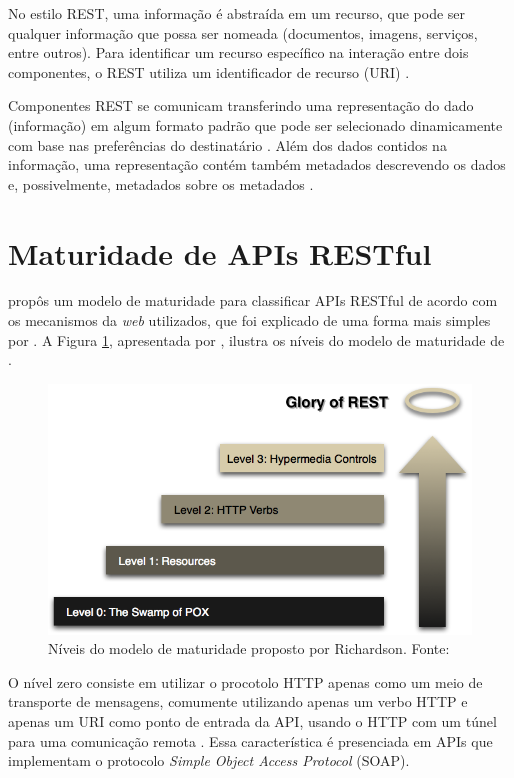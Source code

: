   No estilo REST, uma informação é abstraída em um recurso, que pode ser qualquer informação que possa ser nomeada
  (documentos, imagens, serviços, entre outros). Para identificar um recurso específico na interação entre dois
  componentes, o REST utiliza um identificador de recurso (URI) \cite{fielding2002}.
  
  Componentes REST se comunicam transferindo uma representação do dado (informação) em algum formato padrão que pode
  ser selecionado dinamicamente com base nas preferências do destinatário \cite{fielding2002}. Além dos dados contidos na 
  informação, uma representação contém também metadados descrevendo os dados e, possivelmente, metadados sobre os
  metadados \cite{fielding2002}.
  
  \section{Maturidade de APIs RESTful}
  
       propôs um modelo de maturidade para classificar
      APIs RESTful de acordo com os mecanismos da \textit{web} utilizados,
      que foi explicado de uma forma mais simples por .
      A Figura \ref{fig:glory_of_rest}, apresentada por ,
      ilustra os níveis do modelo de maturidade de .
	
      \begin{figure}[h!]
	\centering
	\includegraphics[scale=0.5]{figuras/glory_of_rest.png}
	\caption{Níveis do modelo de maturidade proposto por Richardson. Fonte: \cite{fowler10}}
	\label{fig:glory_of_rest}
      \end{figure}
      
      O nível zero consiste em utilizar o procotolo HTTP apenas como um meio de transporte de mensagens,
      comumente utilizando apenas um verbo HTTP e apenas um URI como ponto de entrada da API, 
      usando o HTTP com um túnel para uma comunicação remota \cite{fowler10} \cite{richardson09}.
      Essa característica é presenciada em APIs que implementam o protocolo \textit{Simple Object Access Protocol} (SOAP).
      

